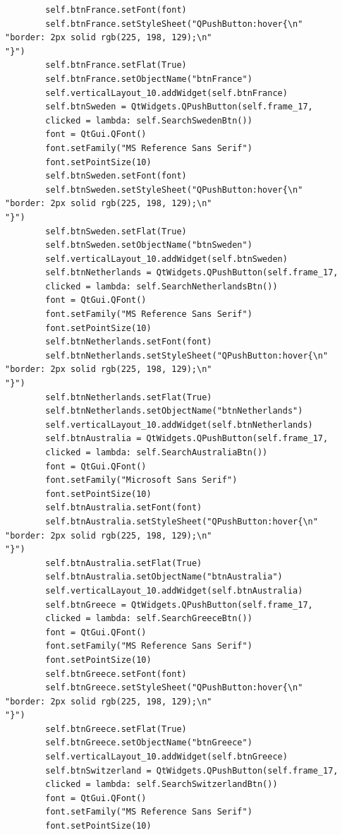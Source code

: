 \documentclass[12pt]{article}
\begin{document}
\begin{verbatim}
        self.btnFrance.setFont(font)
        self.btnFrance.setStyleSheet("QPushButton:hover{\n"
"border: 2px solid rgb(225, 198, 129);\n"
"}")
        self.btnFrance.setFlat(True)
        self.btnFrance.setObjectName("btnFrance")
        self.verticalLayout_10.addWidget(self.btnFrance)
        self.btnSweden = QtWidgets.QPushButton(self.frame_17, 
        clicked = lambda: self.SearchSwedenBtn())
        font = QtGui.QFont()
        font.setFamily("MS Reference Sans Serif")
        font.setPointSize(10)
        self.btnSweden.setFont(font)
        self.btnSweden.setStyleSheet("QPushButton:hover{\n"
"border: 2px solid rgb(225, 198, 129);\n"
"}")
        self.btnSweden.setFlat(True)
        self.btnSweden.setObjectName("btnSweden")
        self.verticalLayout_10.addWidget(self.btnSweden)
        self.btnNetherlands = QtWidgets.QPushButton(self.frame_17,
        clicked = lambda: self.SearchNetherlandsBtn())
        font = QtGui.QFont()
        font.setFamily("MS Reference Sans Serif")
        font.setPointSize(10)
        self.btnNetherlands.setFont(font)
        self.btnNetherlands.setStyleSheet("QPushButton:hover{\n"
"border: 2px solid rgb(225, 198, 129);\n"
"}")
        self.btnNetherlands.setFlat(True)
        self.btnNetherlands.setObjectName("btnNetherlands")
        self.verticalLayout_10.addWidget(self.btnNetherlands)
        self.btnAustralia = QtWidgets.QPushButton(self.frame_17, 
        clicked = lambda: self.SearchAustraliaBtn())
        font = QtGui.QFont()
        font.setFamily("Microsoft Sans Serif")
        font.setPointSize(10)
        self.btnAustralia.setFont(font)
        self.btnAustralia.setStyleSheet("QPushButton:hover{\n"
"border: 2px solid rgb(225, 198, 129);\n"
"}")
        self.btnAustralia.setFlat(True)
        self.btnAustralia.setObjectName("btnAustralia")
        self.verticalLayout_10.addWidget(self.btnAustralia)
        self.btnGreece = QtWidgets.QPushButton(self.frame_17, 
        clicked = lambda: self.SearchGreeceBtn())
        font = QtGui.QFont()
        font.setFamily("MS Reference Sans Serif")
        font.setPointSize(10)
        self.btnGreece.setFont(font)
        self.btnGreece.setStyleSheet("QPushButton:hover{\n"
"border: 2px solid rgb(225, 198, 129);\n"
"}")
        self.btnGreece.setFlat(True)
        self.btnGreece.setObjectName("btnGreece")
        self.verticalLayout_10.addWidget(self.btnGreece)
        self.btnSwitzerland = QtWidgets.QPushButton(self.frame_17,
        clicked = lambda: self.SearchSwitzerlandBtn())
        font = QtGui.QFont()
        font.setFamily("MS Reference Sans Serif")
        font.setPointSize(10)

\end{verbatim}
\end{document}

